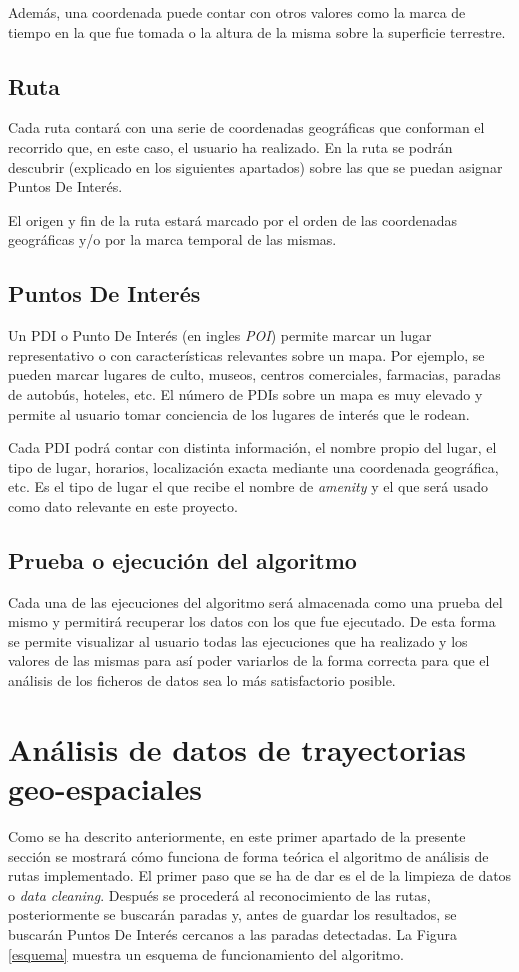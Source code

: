 Además, una coordenada puede contar con otros valores como la marca de tiempo en la que fue tomada o la altura de la misma sobre la superficie terrestre.

\subsection{Ruta}
Cada ruta contará con una serie de coordenadas geográficas que conforman el recorrido que, en este caso, el usuario ha realizado. En la ruta se podrán descubrir  (explicado en los siguientes apartados) sobre las que se puedan asignar Puntos De Interés.

El origen y fin de la ruta estará marcado por el orden de las coordenadas geográficas y/o por la marca temporal de las mismas. 

\subsection{Puntos De Interés}
Un PDI o Punto De Interés (en ingles \textit{POI}) permite marcar un lugar representativo o con características relevantes sobre un mapa. Por ejemplo, se pueden marcar lugares de culto, museos, centros comerciales, farmacias, paradas de autobús, hoteles, etc. El número de PDIs sobre un mapa es muy elevado y permite al usuario tomar conciencia de los lugares de interés que le rodean.

Cada PDI podrá contar con distinta información, el nombre propio del lugar, el tipo de lugar, horarios, localización exacta mediante una coordenada geográfica, etc. Es el tipo de lugar el que recibe el nombre de \textit{amenity} y el que será usado como dato relevante en este proyecto.

\subsection{Prueba o ejecución del algoritmo}
Cada una de las ejecuciones del algoritmo será almacenada como una prueba del mismo y permitirá recuperar los datos con los que fue ejecutado. De esta forma se permite visualizar al usuario todas las ejecuciones que ha realizado y los valores de las mismas para así poder variarlos de la forma correcta para que el análisis de los ficheros de datos sea lo más satisfactorio posible.

\section{Análisis de datos de trayectorias geo-espaciales}
Como se ha descrito anteriormente, en este primer apartado de la presente sección se mostrará cómo funciona de forma teórica el algoritmo de análisis de rutas implementado. El primer paso que se ha de dar es el de la limpieza de datos o \textit{data cleaning}. Después se procederá al reconocimiento de las rutas, posteriormente se buscarán paradas y, antes de guardar los resultados, se buscarán Puntos De Interés cercanos a las paradas detectadas. La Figura \ref{esquema} muestra un esquema de funcionamiento del algoritmo.

